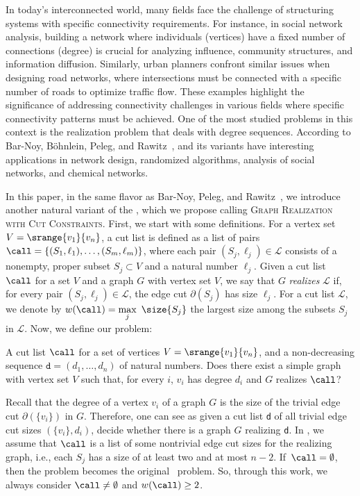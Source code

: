 In today's interconnected world, many fields face the challenge of structuring systems with specific connectivity requirements.
%
For instance, in social network analysis, building a network where individuals (vertices) have a fixed number of connections (degree) is crucial for analyzing influence, community structures, and information diffusion. 
%
Similarly, urban planners confront similar issues when designing road networks, where intersections must be connected with a specific number of roads to optimize traffic flow. 
%
These examples highlight the significance of addressing connectivity challenges in various fields where specific connectivity patterns must be achieved. 
One of the most studied problems in this context is the realization problem that deals with degree sequences.  
%
According to Bar-Noy, Böhnlein, Peleg, and Rawitz~\cite{bar2022vertex}, \GRfull{} and its variants have interesting applications in network design, randomized algorithms, analysis of social networks, and chemical networks.

In this paper, in the same flavor as Bar-Noy, Peleg, and Rawitz~\cite{bar2020vertex}, we introduce another natural variant of the \GRfull{}, which we propose calling \textsc{Graph Realization with Cut Constraints}. 
%
First, we start with some definitions. For a vertex set $V = \srange{v_1}{v_n}$, a cut list is defined as a list of pairs $\call = \{(S_1, \ell_1), \dots, (S_m, \ell_m)\}$, where each pair $(S_j, \ell_j) \in \mathcal{L}$ consists of a nonempty, proper subset $S_j \subset V$ and a natural number $\ell_j$.
%
Given a cut list $\call$ for a set $V$ and a graph $G$ with vertex set $V$, we say that $G$ \emph{realizes} $\mathcal{L}$ if, for every pair $(S_j, \ell_j) \in \mathcal{L}$, the edge cut $\partial(S_j)$ has size $\ell_j$. For a cut list $\mathcal{L}$, we denote by $w(\call) = \max\limits_j\ \size{S_j}$ the largest size among the subsets $S_j$ in $\mathcal{L}$. 
%
Now, we define our problem:

{A cut list $\call$ for a set of vertices $V=\srange{v_1}{v_n}$, and a non-decreasing sequence $\texttt{d} = (d_1, \dots, d_n)$ of natural numbers.}
{Does there exist a simple graph with vertex set $V$ such that, for every $i$, $v_i$ has degree $d_i$ and $G$ realizes $\call$?}

Recall that the degree of a vertex $v_i$ of a graph $G$ is the size of the trivial edge cut $\partial(\{v_i\})$ in $G$. Therefore, one can see \GRfull{} as given a cut list \texttt{d} of all trivial edge cut sizes $(\{v_i\},d_i)$, decide whether there is a graph $G$ realizing \texttt{d}.
%
In \GRC{}, we assume that  $\call$ is a list of some nontrivial edge cut sizes for the realizing graph, i.e., each $S_j$ has a size of at least two and at most $n-2$.
If~$\call=\emptyset$, then the problem becomes the original \GRfull~problem. So, through this work, we always consider $\call\neq \emptyset$ and $w(\call)\geq 2$.

